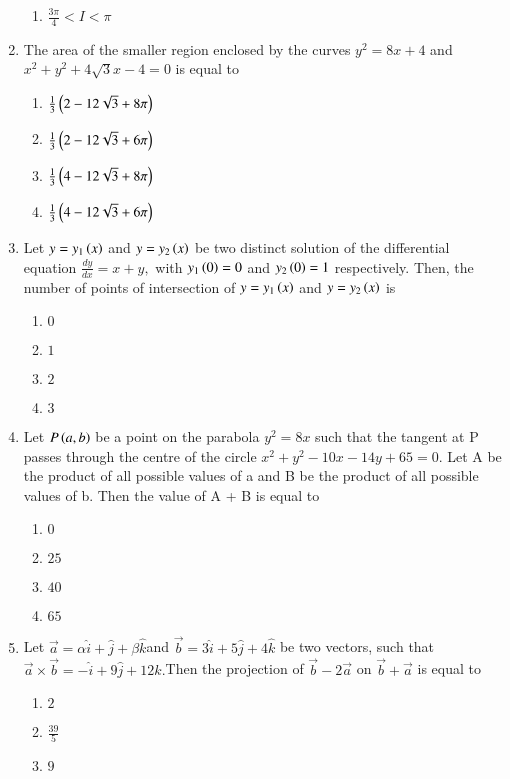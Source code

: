 \documentclass[journal,12pt,twocolumn]{IEEEtran}
\theoremstyle{remark}
\begin{document}
\begin{enumerate}[start=1]
\begin{enumerate}
    \item $ \frac{3\pi}{4}<I<\pi$
\end{enumerate}
\item The area of the smaller region enclosed by the curves $y^2=8x+4$ and $x^2 +y^2 + 4\sqrt{3}x-4 =0$ is equal to
\begin{enumerate}
    \item $ \frac{1}{3}\left(2-12\sqrt{3} + 8\pi\right)$
    \item $ \frac{1}{3}\left(2-12\sqrt{3} + 6\pi\right)$
    \item $ \frac{1}{3}\left(4-12\sqrt{3} + 8\pi\right)$
    \item $ \frac{1}{3}\left(4-12\sqrt{3} + 6\pi\right)$
\end{enumerate}
\item  Let $y=y_1\left(x\right)$ and $y=y_2\left(x\right)$ be two distinct solution of the differential equation $\frac{dy}{dx}=x+y,$ with $y_1\left(0\right)=0$ and $y_2\left(0\right)=1$  respectively. Then, the number of points of intersection of $y=y_1\left(x\right)$ and $y=y_2\left(x\right)$ is
\begin{enumerate}
    \item $0$
    \item $1$
    \item $2$
    \item $3$
\end{enumerate}
\item Let $P\left(a,b\right)$  be a point on the parabola $y^2=8x$ such that the tangent at P passes through the centre of the circle $x^2+y^2-10x-14y+65=0$. Let A be the product of all possible values of a and B be the product of all possible values of b. Then the value of A + B is equal to
\begin{enumerate}
    \item $0$
    \item $25$
    \item $40$
    \item $65$
\end{enumerate}
\item Let $\vec{a} = \alpha \hat{i} + \hat{j} + \beta \hat{k} $and $ \vec{b} = 3 \hat{i} + 5\hat{j} + 4 \hat{k} $ be two vectors, such that $\vec{a} \times \vec{b} = -\hat{i} + 9\hat{j} + 12 \hat{k}. $Then the projection of $ \vec{b}-2\vec{a} $ on $ \vec{b}+ \vec{a}$ is equal to
\begin{enumerate}
    \item $2$
    \item $\frac{39}{5}$
    \item $9$

\end{enumerate}
\end{enumerate}
\end{document}

